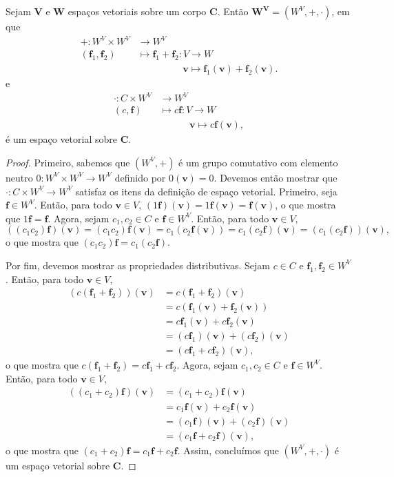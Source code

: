 \begin{prop}
	Sejam $\bm V$ e $\bm W$ espaços vetoriais sobre um corpo $\bm C$. Então $\bm{W^V}=(W^V,+,\cdot)$, em que
	\begin{align*}
	+: W^V \times W^V &\to W^V \\
		(\bm f_1,\bm f_2) &\mapsto \bm f_1+\bm f_2 : V \to W \\
										& \qquad \qquad \ \ \  \bm v \mapsto \bm f_1(\bm v)+\bm f_2(\bm v).
	\end{align*}
e
\begin{align*}
	\cdot: C \times W^V &\to W^V \\
		(c,\bm f) &\mapsto c\bm f : V \to W \\
										& \qquad \ \ \ \ \ \bm v \mapsto c\bm f(\bm v),
	\end{align*}
é um espaço vetorial sobre $\bm C$.
\end{prop}
\begin{proof}
	Primeiro, sabemos que $(W^V,+)$ é um grupo comutativo com elemento neutro $0: W^V \times W^V \to W^V$ definido por $0(\bm v)=0$. Devemos então mostrar que $\cdot: C \times W^V \to W^V$ satisfaz os itens da definição de espaço vetorial. Primeiro, seja $\bm f \in W^V$. Então, para todo $\bm v \in V$, $(1\bm f)(\bm v)=1\bm f(\bm v)=\bm f(\bm v)$, o que mostra que $1\bm f=\bm f$. Agora, sejam $c_1,c_2 \in C$ e $\bm f \in W^V$. Então, para todo $\bm v \in V$,
	\begin{equation*}
	((c_1c_2)\bm f)(\bm v) = (c_1c_2)\bm f(\bm v) = c_1(c_2\bm f(\bm v)) = c_1(c_2\bm f)(\bm v) = (c_1(c_2\bm f))(\bm v),
	\end{equation*}
o que mostra que $(c_1c_2)\bm f=c_1(c_2\bm f)$.

Por fim, devemos mostrar as propriedades distributivas. Sejam $c \in C$ e $\bm f_1,\bm f_2 \in W^V$. Então, para todo $\bm v \in V$,
	\begin{align*}
	(c(\bm f_1+\bm f_2))(\bm v)&=c(\bm f_1+\bm f_2)(\bm v) \\
	&=c(\bm f_1(\bm v)+\bm f_2(\bm v)) \\
	&= c\bm f_1(\bm v)+c \bm f_2(\bm v) \\
	&= (c\bm f_1)(\bm v)+(c \bm f_2)(\bm v) \\
	&=(c\bm f_1+c \bm f_2)(\bm v),
	\end{align*}
o que mostra que $c(\bm f_1+\bm f_2)=c\bm f_1+c \bm f_2$. Agora, sejam $c_1,c_2 \in C$ e $\bm f \in W^V$. Então, para todo $\bm v \in V$,
	\begin{align*}
	((c_1+c_2)\bm f)(\bm v) &= (c_1+c_2) \bm f(\bm v) \\
	&=c_1\bm f(\bm v)+c_2\bm f(\bm v) \\
	&=(c_1\bm f)(\bm v)+(c_2\bm f)(\bm v) \\
	&=(c_1\bm f+c_2\bm f)(\bm v),
	\end{align*}
o que mostra que $(c_1+c_2)\bm f=c_1\bm f+c_2\bm f$. Assim, concluímos que $(W^V,+,\cdot)$ é um espaço vetorial sobre $\bm C$.
\end{proof}

